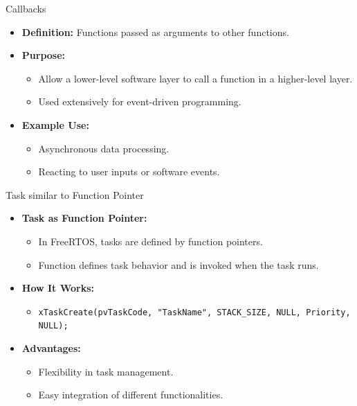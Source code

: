 \documentclass[10pt]{beamer}
\begin{document}
\begin{frame}{Callbacks}
  \begin{itemize}
    \item \textbf{Definition:} Functions passed as arguments to other functions.
    \item \textbf{Purpose:}
      \begin{itemize}
        \item Allow a lower-level software layer to call a function in a higher-level layer.
        \item Used extensively for event-driven programming.
      \end{itemize}
    \item \textbf{Example Use:}
      \begin{itemize}
        \item Asynchronous data processing.
        \item Reacting to user inputs or software events.
      \end{itemize}
  \end{itemize}
\end{frame}

\begin{frame}{Task similar to Function Pointer}
  \begin{itemize}
    \item \textbf{Task as Function Pointer:}
      \begin{itemize}
        \item In FreeRTOS, tasks are defined by function pointers.
        \item Function defines task behavior and is invoked when the task runs.
      \end{itemize}
    \item \textbf{How It Works:}
      \begin{itemize}
        \item \texttt{xTaskCreate(pvTaskCode, "TaskName", STACK\_SIZE, NULL, Priority, NULL);}
      \end{itemize}
    \item \textbf{Advantages:}
      \begin{itemize}
        \item Flexibility in task management.
        \item Easy integration of different functionalities.
      \end{itemize}
  \end{itemize}
\end{frame}
\end{document}
